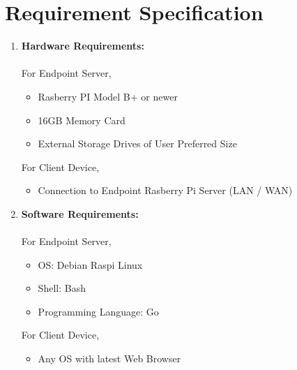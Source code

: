 \documentclass[12pt]{article}
\begin{document}
\section{Requirement Specification}
\vspace{2cm}
\begin{enumerate}
	\item \textbf{Hardware Requirements:} \\ \\
		For Endpoint Server,
		\begin{itemize}
			\item Rasberry PI Model B+ or newer
			\item 16GB Memory Card
			\item External Storage Drives of User Preferred Size
		\end{itemize}
		For Client Device,
		\begin{itemize}
			\item Connection to Endpoint Rasberry Pi Server (LAN / WAN)
		\end{itemize}

	\vspace{1cm}
	\item \textbf{Software Requirements:} \\ \\
		For Endpoint Server,
		\begin{itemize}
				\item OS: Debian Raspi Linux
				\item Shell: Bash
				\item Programming Language: Go
		\end{itemize}
		For Client Device,
		\begin{itemize}
			\item Any OS with latest Web Browser
		\end{itemize}
\end{enumerate}


\iftrue
\fontsize{12pt}{16pt}\selectfont
\end{document}
